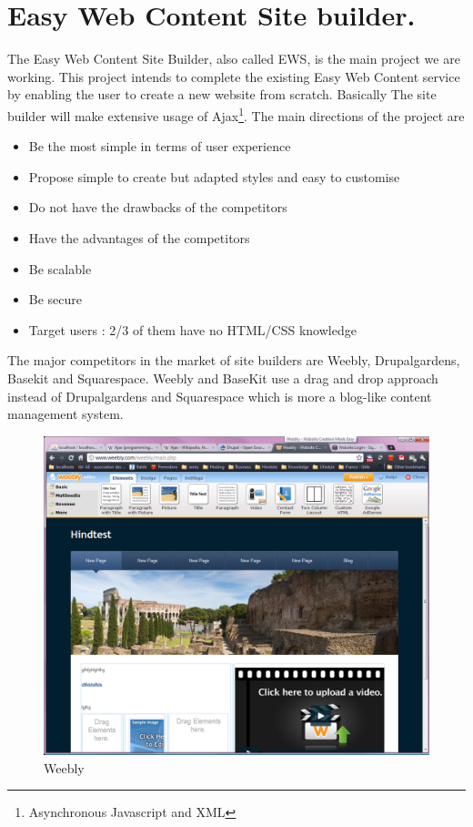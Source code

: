 \chapter{Easy Web Content Site builder.}

The Easy Web Content Site Builder, also called EWS, is the main project we are working. This project intends to complete the existing Easy Web Content service by enabling the user to create a new website from scratch.
Basically The site builder will make extensive usage of Ajax\footnote{Asynchronous Javascript and XML}. The main directions of the project are
\begin{itemize}
\item Be the most simple in terms of user experience
\item Propose simple to create but adapted styles and easy to customise
\item Do not have the drawbacks of the competitors
\item Have the advantages of the competitors
\item Be scalable
\item Be secure
\item Target users : 2/3 of them have no HTML/CSS knowledge
\end{itemize}

The major competitors in the market of site builders are Weebly, Drupalgardens, Basekit and Squarespace.
Weebly and BaseKit use a drag and drop approach instead of Drupalgardens and Squarespace which is more a blog-like content management system.

\begin{figure}[!ht]
\centering
\includegraphics[width=.55\textwidth]{img/weebly.png}
\caption{Weebly}
\label{figure:weebly}
\end{figure}


